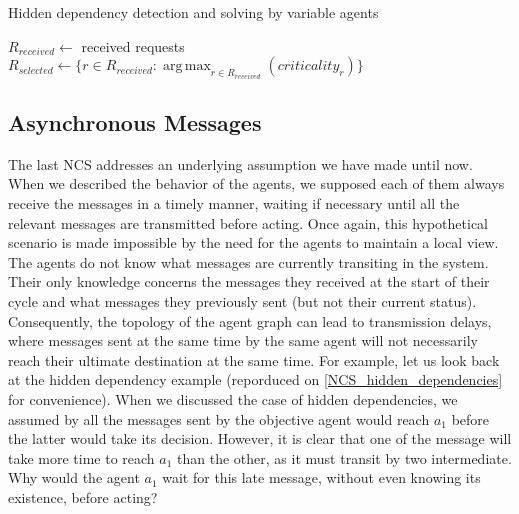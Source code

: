 \begin{algorithm}
\caption{Hidden dependency detection and solving by variable agents}
\label{algo_hidden_dependency_solving}

	$R_{received} \leftarrow $ { received requests}\;
	$R_{selected} \leftarrow \{ r \in R_{received} : \operatorname*{arg\,max}_{r \in R_{received}}(criticality_r) \}$\;


\end{algorithm}

\subsection{Asynchronous Messages}

The last NCS addresses an underlying assumption we have made until now. When we described the behavior of the agents, we supposed each of them always receive the messages in a timely manner, waiting if necessary until all the relevant messages are transmitted before acting. Once again, this hypothetical scenario is made impossible by the need for the agents to maintain a local view. The agents do not know what messages are currently transiting in the system. Their only knowledge concerns the messages they received at the start of their cycle and what messages they previously sent (but not their current status). Consequently, the topology of the agent graph can lead to transmission delays, where messages sent at the same time by the same agent will not necessarily reach their ultimate destination at the same time. For example, let us look back at the hidden dependency example (reporduced on \figurename{} \ref{NCS_hidden_dependencies} for convenience). When we discussed the case of hidden dependencies, we assumed by all the messages sent by the objective agent would reach $a_1$ before the latter would take its decision. However, it is clear that one of the message will take more time to reach $a_1$ than the other, as it must transit by two intermediate. Why would the agent $a_1$ wait for this late message, without even knowing its existence, before acting?

